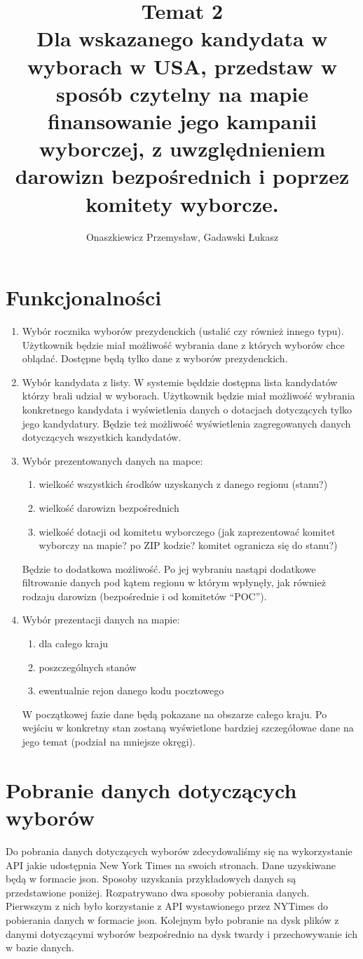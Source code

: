 \documentclass[10pt,a4paper]{article}
\author{Onaszkiewicz Przemysław, Gadawski Łukasz}
\title{Temat 2\\ Dla wskazanego kandydata w wyborach w USA, przedstaw w sposób czytelny na mapie finansowanie jego kampanii wyborczej, z uwzględnieniem darowizn bezpośrednich i poprzez komitety wyborcze. 
}
\begin{document}
\maketitle

\section{Funkcjonalności}
\begin{enumerate}
\item Wybór rocznika wyborów prezydenckich (ustalić czy również innego typu). Użytkownik będzie miał możliwość wybrania dane z których wyborów chce oblądać. Dostępne będą tylko dane z wyborów prezydenckich.
\item Wybór kandydata z listy. W systemie będdzie dostępna lista kandydatów którzy brali udział w wyborach. Użytkownik będzie miał możliwość wybrania konkretnego kandydata i wyświetlenia danych o dotacjach dotyczących tylko jego kandydatury. Będzie też możliwość wyświetlenia zagregowanych danych dotyczących wszystkich kandydatów. 
\item Wybór prezentowanych danych na mapce:
\begin{enumerate}
\item wielkość wszystkich środków uzyskanych z danego regionu (stanu?)
\item wielkość darowizn bezpośrednich
\item wielkość dotacji od komitetu wyborczego (jak zaprezentować komitet wyborczy na mapie? po ZIP kodzie? komitet ogranicza się do stanu?)
\end{enumerate}
 Będzie to dodatkowa możliwość. Po jej wybraniu nastąpi dodatkowe filtrowanie danych pod kątem regionu w którym wpłynęły, jak również rodzaju darowizn (bezpośrednie i od komitetów “POC”).
\item Wybór prezentacji danych na mapie:
\begin{enumerate}
\item dla całego kraju
\item poszczególnych stanów
\item ewentualnie rejon danego kodu pocztowego
\end{enumerate}

W początkowej fazie dane będą pokazane na obszarze całego kraju. Po wejściu w 
konkretny  stan zostaną wyświetlone bardziej szczegółowae dane na jego temat 
(podział na mniejsze okręgi). 

\end{enumerate}
\section{Pobranie danych dotyczących wyborów}
Do pobrania danych dotyczących wyborów zdecydowaliśmy się na wykorzystanie API jakie udostępnia New York Times na swoich stronach. Dane uzyskiwane będą w formacie json.   
Sposoby uzyskania przykładowych danych są przedstawione poniżej. 
Rozpatrywano dwa sposoby pobierania danych. Pierwszym z nich było korzystanie z API wystawionego przez NYTimes  do pobierania danych w formacie json. Kolejnym było pobranie na dysk plików z danymi dotyczącymi wyborów bezpośrednio na dysk twardy i przechowywanie ich w bazie danych.
\end{document}
